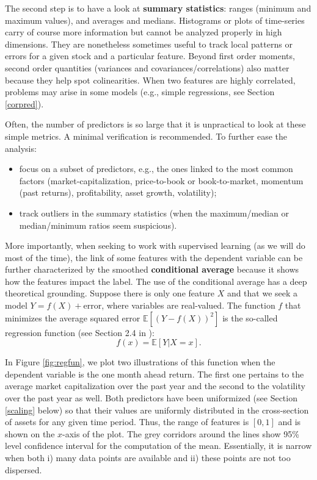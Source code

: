 \documentclass[]{krantz}
\providecommand{\tightlist}{%
  \setlength{\itemsep}{0pt}\setlength{\parskip}{0pt}}
\theoremstyle{definition}
\theoremstyle{definition}
\theoremstyle{definition}
\theoremstyle{remark}
\begin{document}
The second step is to have a look at \textbf{summary statistics}: ranges
(minimum and maximum values), and averages and medians. Histograms or
plots of time-series carry of course more information but cannot be
analyzed properly in high dimensions. They are nonetheless sometimes
useful to track local patterns or errors for a given stock and a
particular feature. Beyond first order moments, second order quantities
(variances and covariances/correlations) also matter because they help
spot colinearities. When two features are highly correlated, problems
may arise in some models (e.g., simple regressions, see Section
\ref{corpred}).

Often, the number of predictors is so large that it is unpractical to
look at these simple metrics. A minimal verification is recommended. To
further ease the analysis:

\begin{itemize}
\tightlist
\item
  focus on a subset of predictors, e.g., the ones linked to the most
  common factors (market-capitalization, price-to-book or
  book-to-market, momentum (past returns), profitability, asset growth,
  volatility);\\
\item
  track outliers in the summary statistics (when the maximum/median or
  median/minimum ratios seem suspicious).
\end{itemize}

More importantly, when seeking to work with supervised learning (as we
will do most of the time), the link of some features with the dependent
variable can be further characterized by the smoothed
\textbf{conditional average} because it shows how the features impact
the label. The use of the conditional average has a deep theoretical
grounding. Suppose there is only one feature \(X\) and that we seek a
model \(Y=f(X)+\text{error}\), where variables are real-valued. The
function \(f\) that minimizes the average squared error
\(\mathbb{E}[(Y-f(X))^2]\) is the so-called regression function (see
Section 2.4 in \citet{friedman2009elements}): \begin{equation}
\label{eq:regfun}
f(x)=\mathbb{E}[Y|X=x].
\end{equation}

In Figure \ref{fig:regfun}, we plot two illustrations of this function
when the dependent variable is the one month ahead return. The first one
pertains to the average market capitalization over the past year and the
second to the volatility over the past year as well. Both predictors
have been uniformized (see Section \ref{scaling} below) so that their
values are uniformly distributed in the cross-section of assets for any
given time period. Thus, the range of features is \([0,1]\) and is shown
on the \(x\)-axis of the plot. The grey corridors around the lines show
95\% level confidence interval for the computation of the mean.
Essentially, it is narrow when both i) many data points are available
and ii) these points are not too dispersed.
\end{document}
